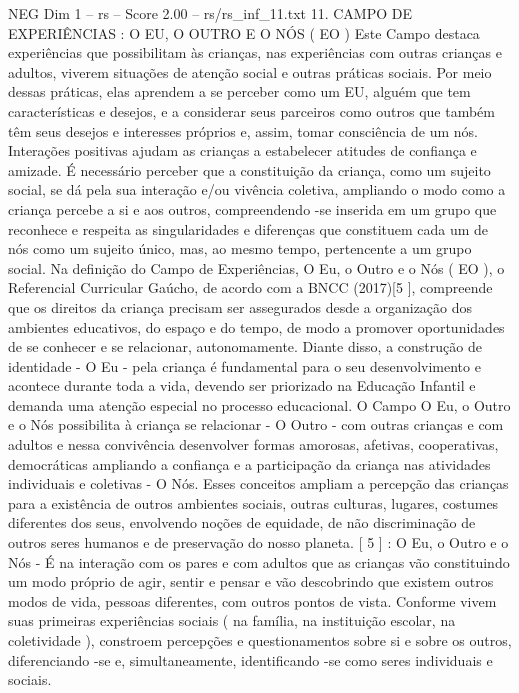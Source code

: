 \begin{textsample}{NEG Dim 1 – rs – Score 2.00 – rs/rs\_inf\_11.txt}  \label{ex:f1_neg_084}
11.
CAMPO DE EXPERIÊNCIAS : O EU, O OUTRO E O NÓS ( EO ) Este Campo destaca experiências que possibilitam às crianças, nas experiências com outras crianças e adultos, viverem situações de atenção social e outras práticas sociais.
Por meio dessas práticas, elas aprendem a se perceber como um EU, alguém que tem características e desejos, e a considerar seus parceiros como outros que também têm seus desejos e interesses próprios e, assim, tomar consciência de um nós.
Interações positivas ajudam as crianças a estabelecer atitudes de confiança e amizade.
É necessário perceber que a constituição da criança, como um sujeito social, se dá pela sua interação e/ou vivência coletiva, ampliando o modo como a criança percebe a si e aos outros, compreendendo -se inserida em um grupo que reconhece e respeita as singularidades e diferenças que constituem cada um de nós como um sujeito único, mas, ao mesmo tempo, pertencente a um grupo social.
Na definição do Campo de Experiências, O Eu, o Outro e o Nós ( EO ), o Referencial Curricular Gaúcho, de acordo com a BNCC (2017)[5 ], compreende que os direitos da criança precisam ser assegurados desde a organização dos ambientes educativos, do espaço e do tempo, de modo a promover oportunidades de se conhecer e se relacionar, autonomamente.
Diante disso, a construção de identidade - O Eu - pela criança é fundamental para o seu desenvolvimento e acontece durante toda a vida, devendo ser priorizado na Educação Infantil e demanda uma atenção especial no processo educacional.
O Campo O Eu, o Outro e o Nós possibilita à criança se relacionar - O Outro - com outras crianças e com adultos e nessa convivência desenvolver formas amorosas, afetivas, cooperativas, democráticas ampliando a confiança e a participação da criança nas atividades individuais e coletivas - O Nós.
Esses conceitos ampliam a percepção das crianças para a existência de outros ambientes sociais, outras culturas, lugares, costumes diferentes dos seus, envolvendo noções de equidade, de não discriminação de outros seres humanos e de preservação do nosso planeta. [ 5 ] : O Eu, o Outro e o Nós - É na interação com os pares e com adultos que as crianças vão constituindo um modo próprio de agir, sentir e pensar e vão descobrindo que existem outros modos de vida, pessoas diferentes, com outros pontos de vista.
Conforme vivem suas primeiras experiências sociais ( na família, na instituição escolar, na coletividade ), constroem percepções e questionamentos sobre si e sobre os outros, diferenciando -se e, simultaneamente, identificando -se como seres individuais e sociais.

\end{textsample}
